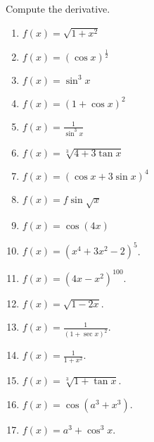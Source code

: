 Compute the derivative.
\begin{multicols}{2}
\begin{enumerate}
\item   $f(x)=\sqrt{1+x^2}$


\item \label{problemd/dx(cos(x))^(1/2)}  $f(x)=(\cos x)^{\frac{1}{ 2}}$


\item $f(x)=\sin^3 x$

\item \label{problemd/dx(1+cos(x))^2} $f(x)=(1+\cos x)^2$


\item   $f(x)=\frac{1}{\sin^3x}$

\item  $f(x)= \sqrt[3]{4+3\tan x}$

\item  $f(x)=(\cos x + 3\sin x)^4$

\item \label{problemd/dx(sin(sqrt(x)))}  $f(x)=f\sin\sqrt{x}$

\item  $f(x)=\cos(4x)$

\item $\displaystyle f(x)= (x^4+3x^2-2)^5$.

\item $\displaystyle f(x)= (4x-x^2)^{100}$.

\item $\displaystyle f(x)= \sqrt{1-2x}$.

\item $\displaystyle f(x)= \frac{1}{(1+\sec x)^2}$.

\item $\displaystyle f(x)=\frac{1}{1+x^2} $.

\item $\displaystyle f(x)= \sqrt[3]{1+\tan x}$.

\item $\displaystyle f(x)=\cos (a^3+x^3) $.

\item $\displaystyle f(x)= a^3+\cos^3 x$.


\end{enumerate}
\end{multicols}
